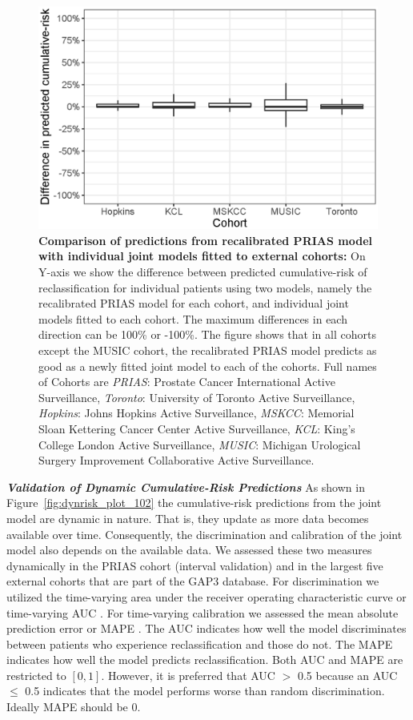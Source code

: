 \begin{figure}[!htb]
\centerline{\includegraphics[width=0.85\columnwidth]{images/calib_insmall_after.eps}}
\caption{\textbf{Comparison of predictions from recalibrated PRIAS model with individual joint models fitted to external cohorts:} On Y-axis we show the difference between predicted cumulative-risk of reclassification for individual patients using two models, namely the recalibrated PRIAS model for each cohort, and individual joint models fitted to each cohort. The maximum differences in each direction can be 100\% or -100\%. The figure shows that in all cohorts except the MUSIC cohort, the recalibrated PRIAS model predicts as good as a newly fitted joint model to each of the cohorts. Full names of Cohorts are \textit{PRIAS}: Prostate Cancer International Active Surveillance, \textit{Toronto}: University of Toronto Active Surveillance, \textit{Hopkins}: Johns Hopkins Active Surveillance, \textit{MSKCC}: Memorial Sloan Kettering Cancer Center Active Surveillance, \textit{KCL}: King's College London Active Surveillance, \textit{MUSIC}: Michigan Urological Surgery Improvement Collaborative Active Surveillance.}
\label{fig:calib_insmall_after}
\end{figure}

\clearpage
\textbf{\textit{Validation of Dynamic Cumulative-Risk Predictions}}
As shown in Figure~\ref{fig:dynrisk_plot_102} the cumulative-risk predictions from the joint model are dynamic in nature. That is, they update as more data becomes available over time. Consequently, the discrimination and calibration of the joint model also depends on the available data. We assessed these two measures dynamically in the PRIAS cohort (interval validation) and in the largest five external cohorts that are part of the GAP3 database. For discrimination we utilized the time-varying area under the receiver operating characteristic curve or time-varying AUC \citep{rizopoulos2017dynamic}. For time-varying calibration we assessed the mean absolute prediction error or MAPE \citep{rizopoulos2017dynamic}. The AUC indicates how well the model discriminates between patients who experience reclassification and those do not. The MAPE indicates how well the model predicts reclassification. Both AUC and MAPE are restricted to $[0,1]$. However, it is preferred that AUC $>$ 0.5 because an AUC $\leq$ 0.5 indicates that the model performs worse than random discrimination. Ideally MAPE should be 0.

